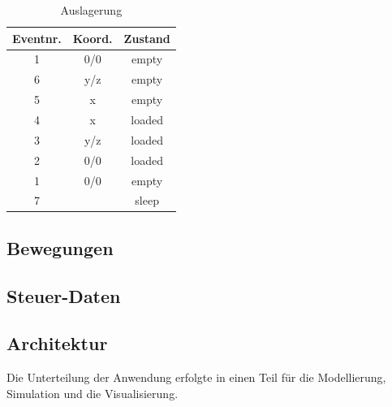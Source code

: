 \begin{table}[H]
  \caption{Auslagerung}
  \label{tab:outs}

  \begin{center}
    \begin{tabular}{ccc}
		Eventnr.&	Koord.&	Zustand\\
		\hline
		1 &			0/0 	&empty\\
		6 &			y/z 	&empty\\
		5 &			x 		&empty\\
		4 &			x 		&loaded\\
		3 &			y/z 	&loaded\\
		2 &			0/0 	&loaded\\
		1	&		0/0		&empty\\
		7 &					&sleep \\
    \end{tabular}
  \end{center}
\end{table}	
%
\subsection{Bewegungen}



%
\subsection{Steuer-Daten}


\subsection{Architektur}
Die Unterteilung der Anwendung erfolgte in einen Teil für die Modellierung, Simulation und die Visualisierung.  





